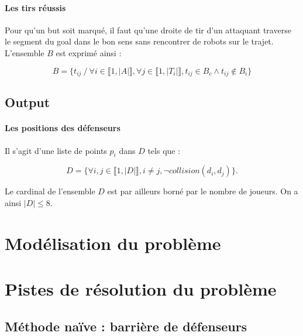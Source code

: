 \documentclass{article}
\begin{document}
\paragraph{Les tirs réussis}
Pour qu'un but soit marqué, il faut qu'une droite de tir d'un attaquant traverse le segment du goal dans le bon sens sans rencontrer de robots sur le trajet. L'ensemble $B$ est exprimé ainsi :

\begin{equation*}
    B = \{t_{ij} \ / \ \forall i \in \llbracket 1, |A| \rrbracket, \forall j \in \llbracket 1, |T_i| \rrbracket, t_{ij}  \in B_c \wedge t_{ij} \notin B_i  \}
\end{equation*}



\subsection{Output}

\paragraph{Les positions des défenseurs} Il s'agit d'une liste de points $p_i$ dans $D$ tels que :

\begin{equation*}
D = \{ \forall i, j \in \llbracket 1, |D| \rrbracket, i \ne j, \neg collision(d_i, d_j) \}.
\end{equation*}

Le cardinal de l'ensemble $D$ est par ailleurs borné par le nombre de joueurs. On a ainsi $|D| \leqslant 8$.



\section{Modélisation du problème}


\section{Pistes de résolution du problème}

\subsection{Méthode naïve : barrière de défenseurs}
\end{document}
